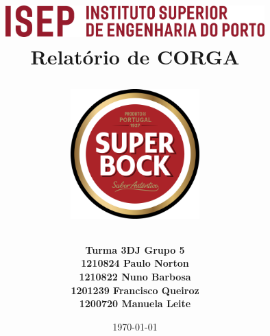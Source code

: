 \documentclass[]{report}
\title{
    \includegraphics[width=10cm]{media/isep.png} \\
    \vfill
    \LARGE\bfseries Relatório de CORGA\\
    \vfill
    \begin{figure}[h]
    \centering
    \includegraphics[width=5cm]{media/Super_Bock_Logo.png}
    \end{figure}

    \vfill
    
    }
\author{
    \large\bfseries Turma 3DJ \textunderscore\space Grupo 5  \\
    1210824 \textunderscore\space Paulo Norton \\
    1210822 \textunderscore\space Nuno Barbosa \\
    1201239 \textunderscore\space Francisco Queiroz \\
    1200720 \textunderscore\space Manuela Leite\\
    }
\date{\today}
\begin{document}
\maketitle


\tableofcontents
\hypertarget{glossary}{\printglossaries}






\appendix


\listoffigures
\end{document}
